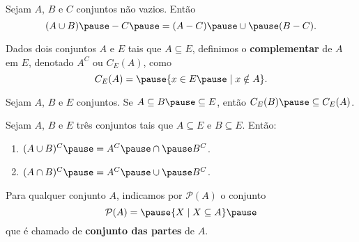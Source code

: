 \documentclass{beamer}
\begin{document}
    \begin{frame}
        \begin{proposicao}
            Sejam $A$, $B$ e $C$ \pause conjuntos não vazios. Então\pause
            \[
                (A \cup B) \pause - C \pause = (A - C) \pause \cup \pause (B - C).
            \]
        \end{proposicao}
    \end{frame}

    \begin{frame}
        \begin{definicao}
        Dados dois conjuntos $A$ e $E$ \pause tais que $A\subseteq E$, \pause definimos o \textbf{complementar} \pause de $A$ em $E$, denotado $A^C$ ou $C_E(A)$, como\pause
        \[
            C_E(A) = \pause \{ x \in E \pause \mid x \notin A \}.
        \]
        \end{definicao}
    \end{frame}

    \begin{frame}
        \begin{proposicao}
            Sejam $A$, $B$ e $E$ conjuntos. \pause Se $A\subseteq B \pause \subseteq E$, \pause então $C_E(B) \pause \subseteq C_E(A)$.
        \end{proposicao}
    \end{frame}

    \begin{frame}
        \begin{proposicao}
            Sejam $A$, $B$ e $E$ três conjuntos \pause tais que $A\subseteq E$ \pause e $B\subseteq E$. \pause Então:\pause
            \begin{enumerate}[label={\roman*})]
                \item $(A\cup B)^C \pause = A^C \pause \cap \pause B^C$.\pause
                \item $(A\cap B)^C \pause = A^C \pause \cup \pause B^C$.
            \end{enumerate}
        \end{proposicao}
    \end{frame}

    \begin{frame}
        \begin{definicao}
            Para qualquer conjunto $A$, \pause indicamos por $\mathcal{P}(A)$ \pause o conjunto\pause
            \[
                \mathcal{P}(A) = \pause \{ X \mid X\subseteq A\}\pause
            \]
            que é chamado de \textbf{conjunto das partes} de $A$.
        \end{definicao}
    \end{frame}
\end{document}
